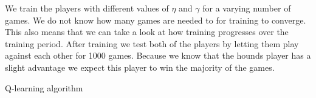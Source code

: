 We train the players with different values of $\eta$ and $\gamma$ for a varying
number of games. We do not know how many games are needed to for training to
converge. This also means that we can take a look at how training progresses
over the training period. After training we test both of the players by letting
them play against each other for 1000 games. Because we know that the hounds
player has a slight advantage we expect this player to win the majority of the
games.

\begin{algorithm}
\caption{Q-learning algorithm\cite{alpaydin}}
\label{alg:Qlearning}
\begin{algorithmic}[1]
	\Repeat
\EndFor
\end{algorithmic}
\end{algorithm}
